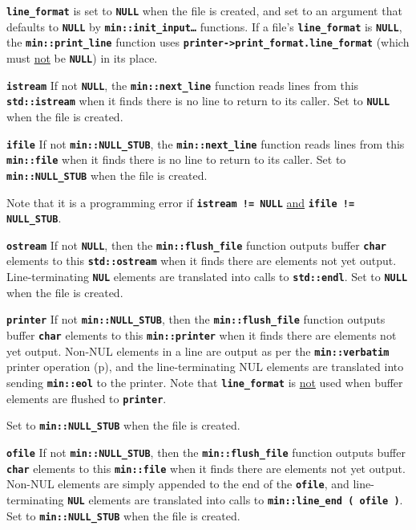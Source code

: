 \documentclass[12pt]{article}
\makeatletter
\newcommand{\TT}[1]{{\tt \bfseries #1}}
\newcommand{\ttmkey}[2]{\TT{#1}\index{#1@{\tt #1}!#2}}
\newcommand{\pagref}[1]{p\pageref{#1}}
\newcommand{\EOL}{\penalty \exhyphenpenalty}
\newenvironment{itemlist}[1][1.2in]%
	{\begin{list}{}{\setlength{\labelwidth}{#1}%
		        \setlength{\leftmargin}{\labelwidth}%
		        \addtolength{\leftmargin}{+0.2in}%
		        \renewcommand{\makelabel}[1]{##1\hfill}}}%
	{\end{list}}
\makeatother
\begin{document}
\begin{itemlist}[1.4in]
\TT{line\_format} is set
to \TT{NULL} when the file is created, and set to an argument
that defaults to \TT{NULL}
by \TT{min::\EOL init\_\EOL input\ldots} functions.
If a file's \TT{line\_format} is \TT{NULL}, the
\TT{min::\EOL print\_\EOL line} function uses
\TT{printer->\EOL print\_\EOL format\EOL .line\_\EOL format}
(which must \underline{not} be \TT{NULL})
in its place.

\item[\ttmkey{istream}{in {\tt min::file}}]
If not \TT{NULL}, the \TT{min::\EOL next\_\EOL line} function
reads lines from this \TT{std::\EOL istream} when it finds
there is no line to return to its caller.
Set to \TT{NULL} when the file is created.

\item[\ttmkey{ifile}{in {\tt min::file}}]
If not \TT{min::NULL\_STUB}, the \TT{min::\EOL next\_\EOL line} function
reads lines from this \TT{min::\EOL file} when it finds
there is no line to return to its caller.
Set to \TT{min::\EOL NULL\_\EOL STUB} when the file is created.

Note that it is a programming error if \TT{istream != NULL}
\underline{and} \TT{ifile != NULL\_\EOL STUB}.

\item[\ttmkey{ostream}{in {\tt min::file}}]\label{OSTREAM_OF_FILE}
If not \TT{NULL}, then the \TT{min::\EOL flush\_\EOL file} function
outputs buffer \TT{char} elements to this \TT{std::\EOL ostream} when it finds
there are elements not yet output.
Line-terminating \TT{NUL} elements are translated into calls to
\TT{std::\EOL endl}.
Set to \TT{NULL} when the file is created.

\item[\ttmkey{printer}{in {\tt min::file}}]\label{PRINTER_OF_FILE}
If not \TT{min::NULL\_STUB}, then the \TT{min::\EOL flush\_\EOL file} function
outputs buffer \TT{char} elements
to this \TT{min::\EOL printer} when it finds
there are elements not yet output.
Non-NUL elements in a
line are output as per the \TT{min::\EOL verbatim}
printer operation (\pagref{MIN::VERBATIM}),
and the line-terminating
NUL elements are translated into sending \TT{min::eol} to the printer.
Note that \TT{line\_\EOL format} is \underline{not} used
when buffer elements are flushed to \TT{printer}.

Set to \TT{min::\EOL NULL\_\EOL STUB} when the file is created.

\item[\ttmkey{ofile}{in {\tt min::file}}]\label{OFILE_OF_FILE}
If not \TT{min::NULL\_STUB}, then the \TT{min::\EOL flush\_\EOL file} function
outputs buffer \TT{char} elements to this \TT{min::\EOL file} when it finds
there are elements not yet output.
Non-NUL elements are simply appended to the end of the \TT{ofile}, and
line-terminating \TT{NUL} elements are translated into calls to
\TT{min::\EOL line\_\EOL end~(~ofile~)}.
Set to \TT{min::\EOL NULL\_\EOL STUB} when the file is created.


\end{itemlist}
\end{document}
